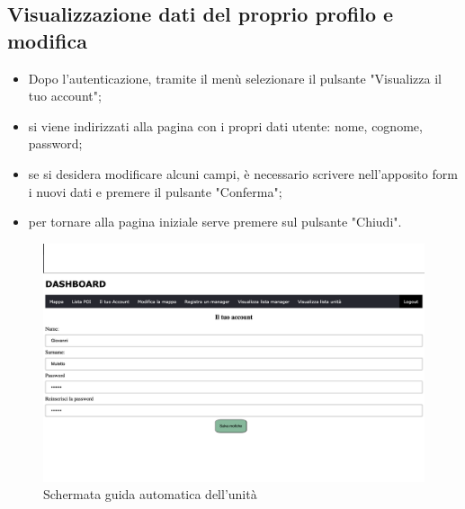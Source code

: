 \subsection{Visualizzazione dati del proprio profilo e modifica}
\begin{itemize}
    \item Dopo l'autenticazione, tramite il menù selezionare il pulsante "Visualizza il tuo account";
    \item si viene indirizzati alla pagina con i propri dati utente: nome, cognome, password;
    \item se si desidera modificare alcuni campi, è necessario scrivere nell'apposito form i nuovi dati e premere il pulsante "Conferma";
    \item per tornare alla pagina iniziale serve premere sul pulsante "Chiudi".
\end{itemize}
\begin{figure}[H]
    \centering
    \includegraphics[scale=0.12]{res/images/account_user.png}
    \caption{Schermata guida automatica dell'unità}
\end{figure}


